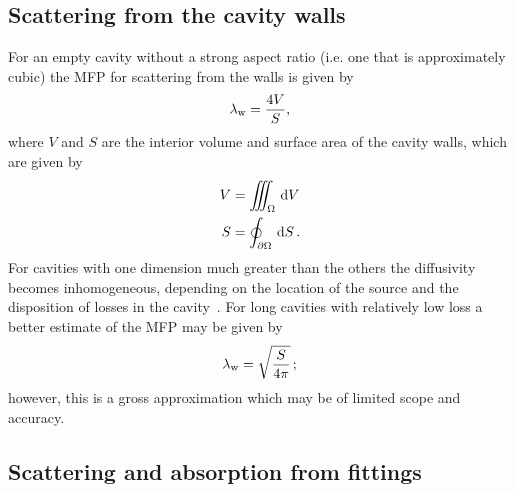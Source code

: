 \documentclass[a4paper]{article}
\numberwithin{equation}{section}
\providecommand\oiint{\oint}
\begin{document}
\subsection[Scattering from the cavity walls]{Scattering from the cavity walls}
\label{sc:sum:walls}

For an empty cavity without a strong aspect ratio (i.e. one that is approximately cubic) 
the MFP for scattering from the walls is given by~\citep{Navarro2015}
\begin{align}
\label{eq:mfp}
\lambda_{\mathrm{w}} = \frac{4V}{S},
\end{align}
where $V$ and $S$ are the interior volume and surface area of the cavity
walls, which are given by
\begin{align}
V &= \iiint_{\Omega }\dif{V} \\
S &= \oiint_{\partial\Omega }\dif{S}\,.
\end{align}
For cavities with one dimension much greater than the others the diffusivity becomes inhomogeneous, 
depending on the location of the source and the disposition of losses in the cavity~\citep{Visentin2012,Visentin2015}.
For long cavities with relatively low loss a better estimate of the MFP may be given by
\begin{align}
\lambda_{\mathrm{w}} = \sqrt{\frac{S}{4\pi}}\,;
\end{align}
however, this is a gross approximation which may be of limited scope and accuracy.

\subsection[Scattering and absorption from fittings]{Scattering and absorption from fittings}
\label{sc:sum:fit}
\end{document}
